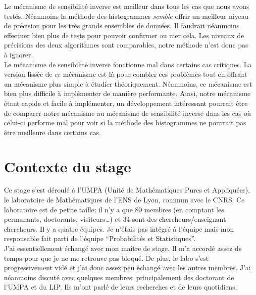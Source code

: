 Le mécanisme de sensibilité inverse est meilleur dans tous les cas que nous avons testés. Néanmoins la méthode des histogrammes \textit{semble} offrir un meilleur niveau de précision pour les très grands ensembles de données. Il faudrait néanmoins effectuer bien plus de tests pour pouvoir confirmer ou nier cela. Les niveaux de précisions des deux algorithmes sont comparables, notre méthode n'est donc pas à ignorer.\\

Le mécanisme de sensibilité inverse fonctionne mal dans certains cas critiques. La version lissée de ce mécanisme est là pour combler ces problèmes tout en offrant un mécanisme plus simple à étudier théoriquement. Néanmoins, ce mécanisme est bien plus difficile à implémenter de manière performante. Ainsi, notre mécanisme étant rapide et facile à implémenter, un développement intéressant pourrait être de comparer notre mécanisme au mécanisme de sensibilité inverse dans les cas où celui-ci performe mal pour voir si la méthode des histogrammes ne pourrait pas être meilleure dans certains cas.
 
\newpage
{}
\printbibliography[heading=bibintoc] 





\clearpage
\appendix

\section{Contexte du stage}

Ce stage s'est déroulé à l'UMPA (Unité de Mathématiques Pures et Appliquées), le laboratoire de Mathématiques de l'ENS de Lyon, commun avec le CNRS. Ce laboratoire est de petite taille: il n'y a que 80 membres (en comptant les permanants, doctorants, visiteurs\dots) et 34 sont des chercheurs/enseignant-chercheurs. Il y a quatre équipes. Je n'étais pas intégré à l'équipe mais mon responsable fait parti de l'équipe ``Probabilités et Statistiques''.\\

J'ai essentiellement échangé avec mon maître de stage. Il m'a accordé assez de temps pour que je ne me retrouve pas bloqué. De plus, le labo s'est progressivement vidé et j'ai donc assez peu échangé avec les autres membres. J'ai néanmoins discuté avec quelques membres: principalement des doctorant de l'UMPA et du LIP. Ils m'ont parlé de leurs recherches et de leurs quotidiens.\\

